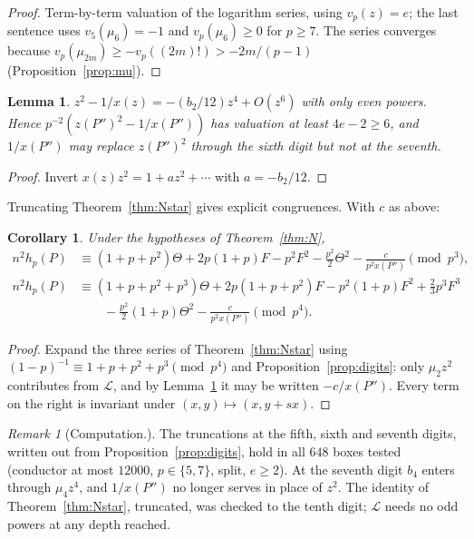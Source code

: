 \documentclass[11pt,a4paper]{amsart}
\newcommand{\cL}{\mathcal{L}}
\theoremstyle{plain}
\newtheorem{lemma}[theorem]{Lemma}
\newtheorem{corollary}[theorem]{Corollary}
\theoremstyle{definition}
\theoremstyle{remark}
\newtheorem{remark}[theorem]{Remark}
\begin{document}
\begin{proof}
Term-by-term valuation of the logarithm series, using $v_p(z)=e$; the last sentence uses $v_5(\mu_6)=-1$ and $v_p(\mu_6)\ge0$ for $p\ge7$. The series converges because $v_p(\mu_{2m})\ge-v_p((2m)!)>-2m/(p-1)$ (Proposition~\ref{prop:mu}).
\end{proof}

\begin{lemma}\label{lem:coords}
$z^2-1/x(z)=-(b_2/12)z^4+O(z^6)$ with only even powers. Hence $p^{-2}(z(P'')^2-1/x(P''))$ has valuation at least $4e-2\ge6$, and $1/x(P'')$ may replace $z(P'')^2$ through the sixth digit but not at the seventh.
\end{lemma}

\begin{proof}
Invert $x(z)z^2=1+az^2+\cdots$ with $a=-b_2/12$.
\end{proof}

Truncating Theorem~\ref{thm:Nstar} gives explicit congruences. With $c$ as above:

\begin{corollary}\label{cor:N34}
Under the hypotheses of Theorem~\ref{thm:N},
\begin{align*}
n^2h_p(P)&\equiv(1+p+p^2)\Theta+2p(1+p)F-p^2F^2-\tfrac{p^2}2\Theta^2-\frac{c}{p^2x(P'')}\pmod{p^3},\\
n^2h_p(P)&\equiv(1+p+p^2+p^3)\Theta+2p(1+p+p^2)F-p^2(1+p)F^2+\tfrac23p^3F^3\\
&\qquad-\tfrac{p^2}2(1+p)\Theta^2-\frac{c}{p^2x(P'')}\pmod{p^4}.
\end{align*}
\end{corollary}

\begin{proof}
Expand the three series of Theorem~\ref{thm:Nstar} using $(1-p)^{-1}\equiv1+p+p^2+p^3\pmod{p^4}$ and Proposition~\ref{prop:digits}: only $\mu_2z^2$ contributes from $\cL$, and by Lemma~\ref{lem:coords} it may be written $-c/x(P'')$. Every term on the right is invariant under $(x,y)\mapsto(x,y+sx)$.
\end{proof}

\begin{remark}
[Computation.] The truncations at the fifth, sixth and seventh digits, written out from Proposition~\ref{prop:digits}, hold in all $648$ boxes tested (conductor at most $12000$, $p\in\{5,7\}$, split, $e\ge2$). At the seventh digit $b_4$ enters through $\mu_4z^4$, and $1/x(P'')$ no longer serves in place of $z^2$. The identity of Theorem~\ref{thm:Nstar}, truncated, was checked to the tenth digit; $\cL$ needs no odd powers at any depth reached.
\end{remark}
\end{document}
